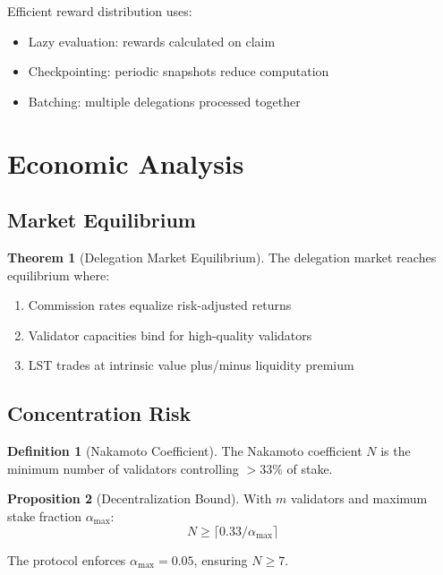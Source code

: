 \documentclass[11pt,a4paper]{article}
\theoremstyle{definition}
\newtheorem{definition}{Definition}[section]
\newtheorem{theorem}{Theorem}[section]
\newtheorem{proposition}[theorem]{Proposition}
\theoremstyle{remark}
\begin{document}
Efficient reward distribution uses:
\begin{itemize}
    \item Lazy evaluation: rewards calculated on claim
    \item Checkpointing: periodic snapshots reduce computation
    \item Batching: multiple delegations processed together
\end{itemize}

\section{Economic Analysis}

\subsection{Market Equilibrium}

\begin{theorem}[Delegation Market Equilibrium]
The delegation market reaches equilibrium where:
\begin{enumerate}
    \item Commission rates equalize risk-adjusted returns
    \item Validator capacities bind for high-quality validators
    \item LST trades at intrinsic value plus/minus liquidity premium
\end{enumerate}
\end{theorem}

\subsection{Concentration Risk}

\begin{definition}[Nakamoto Coefficient]
The Nakamoto coefficient $N$ is the minimum number of validators controlling $> 33\%$ of stake.
\end{definition}

\begin{proposition}[Decentralization Bound]
With $m$ validators and maximum stake fraction $\alpha_{\max}$:
\begin{equation}
    N \geq \lceil 0.33 / \alpha_{\max} \rceil
\end{equation}
\end{proposition}

The protocol enforces $\alpha_{\max} = 0.05$, ensuring $N \geq 7$.
\end{document}
